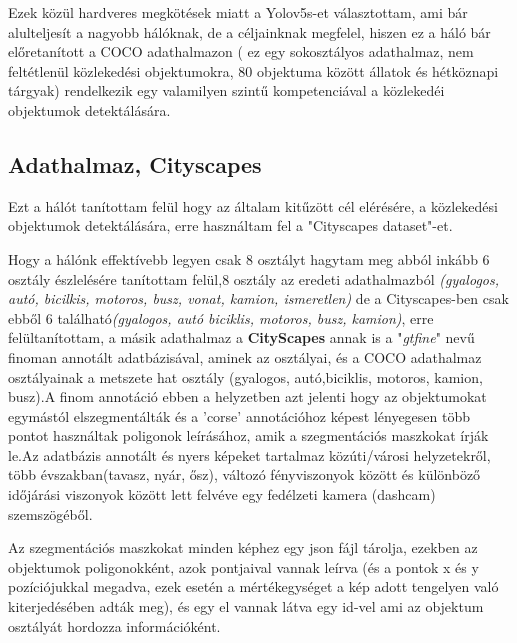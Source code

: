 \documentclass{article}
\begin{document}
\vspace{3mm}
\noindent Ezek közül hardveres megkötések miatt a Yolov5s-et választottam, ami bár alulteljesít a nagyobb hálóknak, de a céljainknak megfelel, \noindent
\noindent hiszen ez a háló bár előretanított a COCO adathalmazon ( ez egy sokosztályos adathalmaz, nem feltétlenül közlekedési objektumokra, 80 objektuma között állatok és hétköznapi tárgyak) rendelkezik egy valamilyen szintű kompetenciával a közlekedéi objektumok detektálására.

\newpage
\subsection{Adathalmaz, Cityscapes}
 Ezt a hálót tanítottam felül hogy az általam kitűzött cél elérésére, a közlekedési objektumok detektálására, erre használtam fel a "Cityscapes dataset"\cite{cityscapes}-et.\par 
 Hogy a hálónk effektívebb legyen csak 8 osztályt hagytam meg abból inkább 6 osztály észlelésére tanítottam felül,8 osztály az eredeti adathalmazból \textit{(gyalogos, autó, bicilkis, motoros, busz, vonat, kamion, ismeretlen)} de a Cityscapes-ben csak ebből 6 található\textit{(gyalogos, autó biciklis, motoros, busz, kamion)}, erre felültanítottam,
 a másik adathalmaz a \textbf{CityScapes} annak is a "\textit{gtfine}" nevű finoman annotált adatbázisával, aminek az osztályai, és a COCO adathalmaz osztályainak a metszete hat osztály (gyalogos, autó,biciklis, motoros, kamion, busz).A finom annotáció ebben a helyzetben azt jelenti hogy az objektumokat egymástól elszegmentálták és a 'corse' annotációhoz képest lényegesen több pontot használtak poligonok leírásához, amik a szegmentációs maszkokat írják le.Az adatbázis annotált és nyers képeket tartalmaz
 közúti/városi helyzetekről, több évszakban(tavasz, nyár, ősz), változó fényviszonyok között és különböző időjárási viszonyok között lett felvéve egy fedélzeti kamera (dashcam) szemszögéből.
 \par Az szegmentációs maszkokat minden képhez egy json fájl tárolja, ezekben az objektumok poligonokként, azok pontjaival vannak leírva (és a pontok x és y pozíciójukkal megadva, ezek esetén a mértékegységet a kép adott tengelyen való kiterjedésében adták meg), és egy el vannak látva egy id-vel ami az objektum osztályát hordozza információként.
\end{document}
